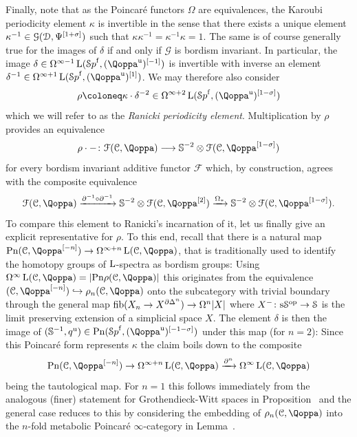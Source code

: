 \begin{construction}
Finally, note that as the Poincaré functors $\Omega$ are equivalences, the Karoubi periodicity element $\kappa$ is invertible in the sense that there exists a unique element $\kappa^{-1} \in \mathcal G(\mathcal{D},\Psi^{[1+\sigma]})$ such that $\kappa\kappa^{-1}=\kappa^{-1}\kappa=1$. The same is of course generally true for the images of $\delta$ if and only if $\mathcal G$ is bordism invariant.  
In particular, the image $\delta \in \Om^{\infty-1}\L(\Spaf,(\QF^\uni)\qshift{-1})$ is invertible with inverse an element $\delta^{-1} \in \Om^{\infty+1}\L(\Spaf,(\QF^\uni)\qshift{1})$. %
We may therefore also consider
\[
\rho \coloneq \kappa \cdot \delta^{-2} \in \Om^{\infty+2}\L(\Spaf,(\QF^\uni)\qshift{1-\sigma})
\]
which we will refer to as the \emph{Ranicki periodicity element}. Multiplication by $\rho$ provides an equivalence
\[
\rho \cdot - \colon \F(\C,\QF) \longrightarrow \SS^{-2}\otimes \F(\C,\QF\qshift{1-\sigma})
\]
for every bordism invariant additive functor $\mathcal F$ which, by construction, agrees with the composite equivalence
\[
\F(\C,\QF) \xrightarrow{\partial^{-1} \circ \partial^{-1}} \SS^{-2}\otimes \F(\C,\QF\qshift{2}) \xrightarrow{\Omega_*} \SS^{-2}\otimes \F(\C,\QF\qshift{1-\sigma}).
\]
To compare this element to Ranicki's incarnation of it, let us finally give an explicit representative for $\rho$. To this end, recall that there is a natural map $\Poinc(\C,\QF\qshift{-n}) \rightarrow \Omega^{\infty+n}\L(\C,\QF)$, that is traditionally used to identify the homotopy groups of $\operatorname L$-spectra as bordism groups: Using $\Omega^\infty\L(\C,\QF) = |\Poinc \rho(\C,\QF)|$ this originates from the equivalence $(\C,\QF\qshift{-n}) \hookrightarrow \rho_n(\C,\QF)$ onto the subcategory with trivial boundary through the general map $\operatorname{fib}(X_n \rightarrow X^{\partial \Delta^n}) \rightarrow \Omega^n|X|$ %
where $X^- \colon \mathrm s\mathcal S^\mathrm{op} \rightarrow \mathcal S$ is the limit preserving extension of a simplicial space $X$. The element $\delta$ is then the image of $(\SS^{-1},q^\uni) \in \Poinc(\Spaf,(\QF^\uni)\qshift{-1-\sigma})$ under this map (for $n=2$): Since this Poincaré form represents $\kappa$ the claim boils down to the composite
\[
\Poinc(\C,\QF\qshift{-n}) \rightarrow \Omega^{\infty+n}\L(\C,\QF) \xrightarrow{\partial^{n}}  \Omega^{\infty}\L(\C,\QF)
\]
being the tautological map. For $n=1$ this follows immediately from the analogous (finer) statement for Grothendieck-Witt spaces in Proposition~ and the general case reduces to this by considering the embedding of $\rho_n(\C,\QF)$ into the $n$-fold metabolic Poincaré $\infty$-category in Lemma~. 
\end{construction}







